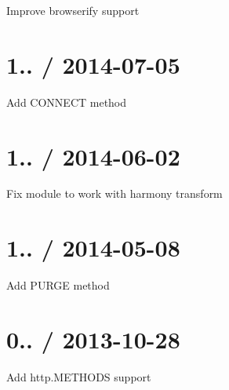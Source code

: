 
\begin{DoxyItemize}
\item Improve {\ttfamily browserify} support
\end{DoxyItemize}

\section*{1.. / 2014-\/07-\/05 }


\begin{DoxyItemize}
\item Add {\ttfamily C\+O\+N\+N\+E\+C\+T} method
\end{DoxyItemize}

\section*{1.. / 2014-\/06-\/02 }


\begin{DoxyItemize}
\item Fix module to work with harmony transform
\end{DoxyItemize}

\section*{1.. / 2014-\/05-\/08 }


\begin{DoxyItemize}
\item Add {\ttfamily P\+U\+R\+G\+E} method
\end{DoxyItemize}

\section*{0.. / 2013-\/10-\/28 }


\begin{DoxyItemize}
\item Add {\ttfamily http.\+M\+E\+T\+H\+O\+D\+S} support 
\end{DoxyItemize}